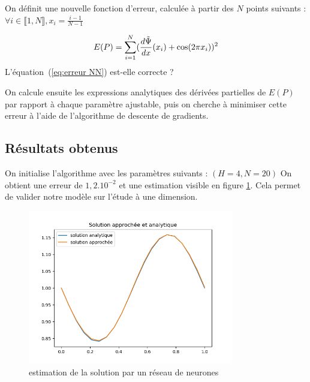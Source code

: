 \documentclass[12pt]{report}
\begin{document}
On définit une nouvelle fonction d'erreur, calculée à partir des $N$ points suivants : $\forall i \in\llbracket 1,N \rrbracket, x_i = \frac{i-1}{N-1} $ 

\begin{equation}
        E(P) = \sum_{i=1}^{N} (\frac{d\Tilde{\Psi}}{dx}(x_i) + \cos(2\pi x_i))^2
\label{eq:erreur NN}
\end{equation}
{\color{red}L'équation~(\ref{eq:erreur NN}) est-elle correcte ?}

On calcule ensuite les expressions analytiques des dérivées partielles de $E(P)$ par rapport à chaque paramètre ajustable, puis on cherche à minimiser cette erreur à l'aide de l'algorithme de descente de gradients.

\subsection{Résultats obtenus}
On initialise l'algorithme avec les paramètres suivants :
$(H=4, N=20)$
On obtient une erreur de $1,2.10^{-2}$ et une estimation visible en figure \ref{fig:resultat_NN}. Cela permet de valider notre modèle sur l'étude à une dimension.

\begin{figure}
\centering
\includegraphics[width=0.8\textwidth]{resultat_NN.png}
\caption{\label{fig:resultat_NN}estimation de la solution par un réseau de neurones}
\end{figure}
\end{document}
